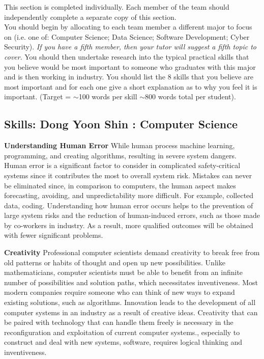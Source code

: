 \documentclass[a4paper, 11pt]{report}
\begin{document}
This section is completed individually. Each member of the team should independently complete a separate copy of this section.\\
You should begin by allocating to each team member a different major to focus on (i.e. one of: Computer Science; Data Science; Software Development; Cyber Security). \textit{If you have a fifth member, then your tutor will suggest a fifth topic to cover}. You should then undertake research into the typical practical skills that you believe would be most important to someone who graduates with this major and is then working in industry. You should list the 8 skills that you believe are most important and for each one give a short explanation as to why you feel it is important. (Target = $\sim$100 words per skill $\sim$800 words total per student).

\subsection{Skills: Dong Yoon Shin : Computer Science}

\textbf{Understanding Human Error}
While human process machine learning, programming, and creating algorithms, resulting in severe system dangers. Human error is a significant factor to consider in complicated safety-critical systems since it contributes the most to overall system risk. Mistakes can never be eliminated since, in comparison to computers, the human aspect makes forecasting, avoiding, and unpredictability more difficult. For example, collected data, coding. Understanding how human error occurs helps to the prevention of large system risks and the reduction of human-induced errors, such as those made by co-workers in industry. As a result, more qualified outcomes will be obtained with fewer significant problems.

\textbf{Creativity}
Professional computer scientists demand creativity to break free from old patterns or habits of thought and open up new possibilities. Unlike mathematicians, computer scientists must be able to benefit from an infinite number of possibilities and solution paths, which necessitates inventiveness. Most modern companies require someone who can think of new ways to expand existing solutions, such as algorithms. Innovation leads to the development of all computer systems in an industry as a result of creative ideas. Creativity that can be paired with technology that can handle them freely is necessary in the reconfiguration and exploitation of current computer systems., especially to construct and deal with new systems, software, requires logical thinking and inventiveness.
\end{document}
